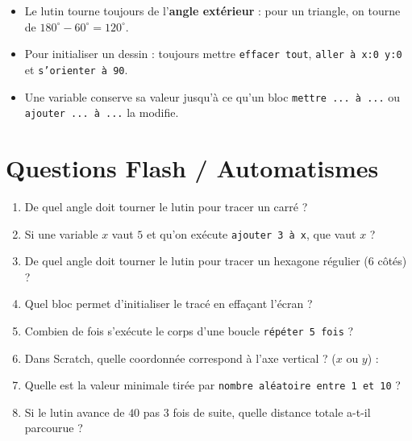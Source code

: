 \begin{cadreretenu}
\begin{itemize}[leftmargin=1.5em, itemsep=1pt]
    \item Le lutin tourne toujours de l'\textbf{angle extérieur} : pour un triangle, on tourne de $180^\circ - 60^\circ = 120^\circ$.
    \item Pour initialiser un dessin : toujours mettre \texttt{effacer tout}, \texttt{aller à x:0 y:0} et \texttt{s'orienter à 90}.
    \item Une variable conserve sa valeur jusqu'à ce qu'un bloc \texttt{mettre ... à ...} ou \texttt{ajouter ... à ...} la modifie.
\end{itemize}
\end{cadreretenu}

\newpage

\section{Questions Flash / Automatismes}

\begin{automatisme}
\begin{enumerate}[label=\textbf{Q\arabic*.}, itemsep=1pt]
    \item De quel angle doit tourner le lutin pour tracer un carré ? \pointille[2.5cm]
    \item Si une variable $x$ vaut $5$ et qu'on exécute \texttt{ajouter 3 à x}, que vaut $x$ ? \pointille[2cm]
    \item De quel angle doit tourner le lutin pour tracer un hexagone régulier ($6$ côtés) ? \pointille[2cm]
    \item Quel bloc permet d'initialiser le tracé en effaçant l'écran ? \pointille[3cm]
    \item Combien de fois s'exécute le corps d'une boucle \texttt{répéter 5 fois} ? \pointille[2cm]
    \item Dans Scratch, quelle coordonnée correspond à l'axe vertical ? ($x$ ou $y$) : \pointille[2cm]
    \item Quelle est la valeur minimale tirée par \texttt{nombre aléatoire entre 1 et 10} ? \pointille[2cm]
    \item Si le lutin avance de $40$ pas $3$ fois de suite, quelle distance totale a-t-il parcourue ? \pointille[2cm]
\end{enumerate}
\end{automatisme}


